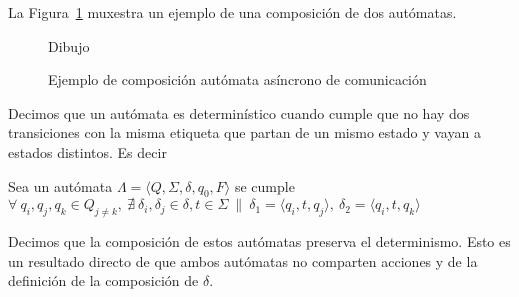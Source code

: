 





La Figura~\ref{fig:ejemplo-aa} muxestra un ejemplo de una composición de dos autómatas. 

\begin{figure}[ht]
\begin{center}
Dibujo
\end{center}
\caption{Ejemplo de composición autómata asíncrono de comunicación}
\label{fig:ejemplo-aa}
\end{figure} 

\begin{definition}[Determinismo] Decimos que un autómata es determinístico cuando cumple que no hay dos transiciones con la misma etiqueta que partan de un mismo estado y vayan a estados distintos. Es decir 

\begin{centering}
Sea un autómata $ \Lambda = \langle Q, \Sigma, \delta, q_0, F \rangle$ se cumple
$ \forall \  q_i, q_j, q_k \in Q_{j \neq k}, \  \nexists \ \delta_i, \delta_j \in \delta, t \in \Sigma \ \| \  \delta_1 = \langle q_i, t, q_j \rangle, \ \delta_2 = \langle q_i, t, q_k \rangle$ \\
\end{centering} 

Decimos que la composición de estos autómatas preserva el determinismo. Esto es un resultado directo de que ambos autómatas no comparten acciones y de la definición de la composición de $\delta$.

\end{definition}


